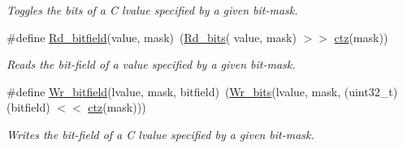 \begin{DoxyCompactItemize}
\begin{DoxyCompactList}\small\item\em Toggles the bits of a C lvalue specified by a given bit-\/mask. \end{DoxyCompactList}\item 
\#define \mbox{\hyperlink{group__group__sam0__utils_gaa7ee388a5bd843e5e0ba3d194bc1d8a4}{Rd\+\_\+bitfield}}(value,  mask)~(\mbox{\hyperlink{group__group__sam0__utils_ga53d9294b7065346ffa04d7991d2bc31e}{Rd\+\_\+bits}}( value, mask) $>$$>$ \mbox{\hyperlink{group__group__sam0__utils_gab069bfec305db5213465d3b689836404}{ctz}}(mask))
\begin{DoxyCompactList}\small\item\em Reads the bit-\/field of a value specified by a given bit-\/mask. \end{DoxyCompactList}\item 
\#define \mbox{\hyperlink{group__group__sam0__utils_gaa2ede64db1455ec339cd8a3303647644}{Wr\+\_\+bitfield}}(lvalue,  mask,  bitfield)~(\mbox{\hyperlink{group__group__sam0__utils_ga97b2bc0b5cdc7ec5293b7a5304cee0f0}{Wr\+\_\+bits}}(lvalue, mask, (uint32\+\_\+t)(bitfield) $<$$<$ \mbox{\hyperlink{group__group__sam0__utils_gab069bfec305db5213465d3b689836404}{ctz}}(mask)))
\begin{DoxyCompactList}\small\item\em Writes the bit-\/field of a C lvalue specified by a given bit-\/mask. \end{DoxyCompactList}\end{DoxyCompactItemize}

